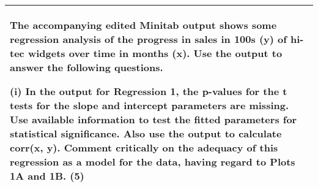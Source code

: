 \documentclass[a4paper,12pt]{article}
\begin{document}
\begin{table}[ht!]
     \centering
     \begin{tabular}{|p{15cm}|}
     \hline        
The accompanying edited Minitab output shows some regression analysis of the progress in sales in 100s (y) of hi-tec widgets over time in months (x).  Use the output to answer the following questions. 
 
(i) In the output for Regression 1, the p-values for the t tests for the slope and intercept parameters are missing.  Use available information to test the fitted parameters for statistical significance.  Also use the output to calculate corr(x, y).  Comment critically on the adequacy of this regression as a model for the data, having regard to Plots 1A and 1B. (5) 

 
 \\ \hline
      \end{tabular}
    \end{table}
    
\end{document}
